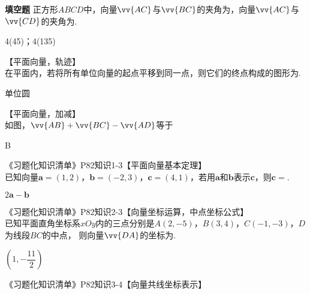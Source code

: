 \begin{exercise}{\bf 填空题}
      正方形$ABCD$中，向量$\vv{AC}$与$\vv{BC}$的夹角为\tk，向量$\vv{AC}$与$\vv{CD}$的夹角为\tk.
      \begin{answer}
        \dfrac{\piup}4(45\degree)；\dfrac{3\piup}4(135\degree)
      \end{answer}
    \item 【平面向量，轨迹】\\
      在平面内，若将所有单位向量的起点平移到同一点，则它们的终点构成的图形为\tk.
      \begin{answer}
        单位圆
      \end{answer}
    \item 【平面向量，加减】\\
      如图，$\vv{AB}+\vv{BC}-\vv{AD}$等于\xz
      \begin{minipage}[b]{0.7\linewidth}
      \end{minipage}\hfill
      \begin{minipage}[h]{0.3\linewidth}
      \end{minipage}
      \begin{answer}
        B
      \end{answer}
    \item 《习题化知识清单》P82知识1-3【平面向量基本定理】\\
      已知向量$\bm a=(1,2)$，$\bm b=(-2,3)$，$\bm c=(4,1)$，若用$\bm a$和$\bm b$表示$\bm c$，则$\bm c=$\tk.
      \begin{answer}
        $2\bm a-\bm b$
      \end{answer}
    \item 《习题化知识清单》P82知识2-3【向量坐标运算，中点坐标公式】\\
      已知平面直角坐标系$xOy$内的三点分别是$A(2,-5)$，$B(3,4)$，$C(-1,-3)$，$D$为线段$BC$的中点，
      则向量$\vv{DA}$的坐标为\tk.
      \begin{answer}
        $(1,-\dfrac{11}2)$
      \end{answer}
    \item 《习题化知识清单》P82知识3-4【向量共线坐标表示】\\

\end{exercise}
